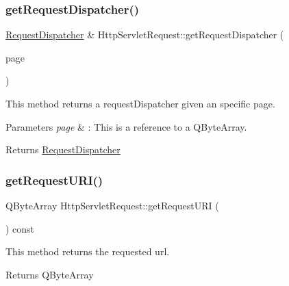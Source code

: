 \subsubsection{\texorpdfstring{get\+Request\+Dispatcher()}{getRequestDispatcher()}}
{\footnotesize\ttfamily \mbox{\hyperlink{class_request_dispatcher}{Request\+Dispatcher}} \& Http\+Servlet\+Request\+::get\+Request\+Dispatcher (\begin{DoxyParamCaption}\item[{const Q\+String \&}]{page }\end{DoxyParamCaption})}



This method returns a request\+Dispatcher given an specific page. 


\begin{DoxyParams}{Parameters}
{\em page} & \+: This is a reference to a Q\+Byte\+Array. \\
\hline
\end{DoxyParams}
\begin{DoxyReturn}{Returns}
\mbox{\hyperlink{class_request_dispatcher}{Request\+Dispatcher}} 
\end{DoxyReturn}
\mbox{\label{class_http_servlet_request_a788609a8520897ecaa91875a91b0e921}} 
\subsubsection{\texorpdfstring{get\+Request\+U\+R\+I()}{getRequestURI()}}
{\footnotesize\ttfamily Q\+Byte\+Array Http\+Servlet\+Request\+::get\+Request\+U\+RI (\begin{DoxyParamCaption}{ }\end{DoxyParamCaption}) const}



This method returns the requested url. 

\begin{DoxyReturn}{Returns}
Q\+Byte\+Array 
\end{DoxyReturn}
\mbox{\label{class_http_servlet_request_a81efdae7956ec53f0827da7ab39a7a4f}} 
